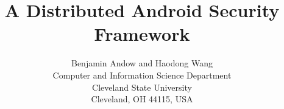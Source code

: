 \documentclass[10pt,conference]{IEEEtran}
\begin{document}
\title{A Distributed Android Security Framework}
\author{
    Benjamin Andow and Haodong Wang\\
    Computer and Information Science Department\\
    Cleveland State University\\
    Cleveland, OH 44115, USA
}


\maketitle


%







\end{document}
